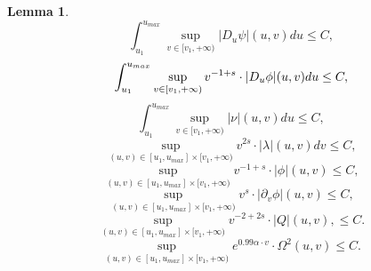 \documentclass[10pt,a4paper]{article}
\theoremstyle{plain}
\newtheorem{lem}[thm]{Lemma}
\theoremstyle{remark}
\newtheorem{rmk}{Remark}[section]
\theoremstyle{definition}
\theoremstyle{plain}
\theoremstyle{remark}
\theoremstyle{definition}
\newcommand{\uu}{u_{max}}
\numberwithin{equation}{section}
\begin{document}
\begin{lem}
\begin{equation}
	\int_{u_1}^{\uu} \sup_{v \in [v_1,+\infty)} |D_u \psi|(u,v)du  \leq C ,	\end{equation} 	\begin{equation} \label{duphiL12}
	\int_{u_1}^{\uu} \sup_{v \in [v_1,+\infty)} v^{-1+s} \color{black} \cdot |D_u \phi|(u,v)du  \leq C ,	\end{equation} 	\begin{equation} \label{durL12}
	\int_{u_1}^{\uu} \sup_{v \in [v_1,+\infty)} |\nu|(u,v)du  \leq C ,
	\end{equation} 	\begin{equation} \label{dvrL12}
	\sup_{(u,v) \in [u_1,\uu] \times [v_1,+\infty)} v^{2s} \cdot |\lambda|(u,v) dv \leq C,
	\end{equation} %
	\begin{equation} \label{phiLinfty2}
	\sup_{(u,v) \in [u_1,\uu] \times [v_1,+\infty)} v^{-1+s} \cdot|\phi|(u,v) \leq C,
	\end{equation} 
	\begin{equation} \label{dvphiLinfty2}
	\sup_{(u,v) \in [u_1,\uu] \times [v_1,+\infty)} v^{s} \cdot|\partial_v \phi|(u,v) \leq C,
	\end{equation}    %
	\begin{equation} \label{QLinfty2}
	\sup_{(u,v) \in [u_1,\uu] \times  [v_1,+\infty)} v^{-2+2s} \cdot|Q|(u,v), \leq C.	\end{equation}   \begin{equation} \label{OmegaLinfty2}
	\sup_{(u,v) \in [u_1,\uu] \times  [v_1,+\infty)} e^{0.99 \alpha \cdot  v}\cdot \Omega^2(u,v) \leq C.	\end{equation}  
\end{lem}
\end{document}

